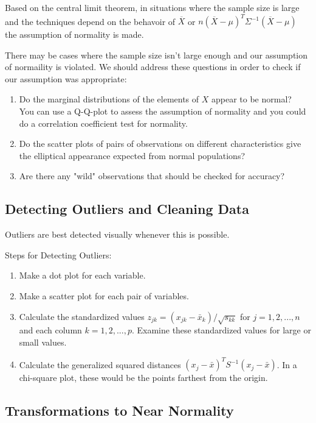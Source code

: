 \documentclass[a4paper]{article}
\begin{document}
Based on the central limit theorem, in situations where the sample size is large and the techniques depend on the behavoir of $\overline{X}$ or $n(\overline{X}-\mu)^T\Sigma^{-1} (\overline{X}-\mu)$ the assumption of normality is made. 

There may be cases where the sample size isn't large enough and our assumption of normaility is violated. We should address these questions in order to check if our assumption was appropriate:

\begin{enumerate}
\item Do the marginal distributions of the elements of $X$ appear to be normal?\\
You can use a Q-Q-plot to assess the assumption of normality and you could do a correlation coefficient test for normality. 
\item Do the scatter plots of pairs of observations on different characteristics give the elliptical appearance expected from normal populations? 
\item Are there any "wild" observations that should be checked for accuracy?
\end{enumerate} 

\subsection*{Detecting Outliers and Cleaning Data}

Outliers are best detected visually whenever this is possible. 

Steps for Detecting Outliers:
\begin{enumerate}
\item Make a dot plot for each variable.
\item Make a scatter plot for each pair of variables.
\item Calculate the standardized values $z_{jk}=(x_{jk}-\bar{x}_k)/\sqrt{s_{kk}}$ for $j=1,2, ..., n$ and each column $k=1, 2, ..., p$. Examine these standardized values for large or small values.
\item Calculate the generalized squared distances $(x_j-\bar{x})^TS^{-1}(x_j-\bar{x})$. In a chi-square plot, these would be the points farthest from the origin. 
\end{enumerate}

\subsection*{Transformations to Near Normality}
\end{document}
